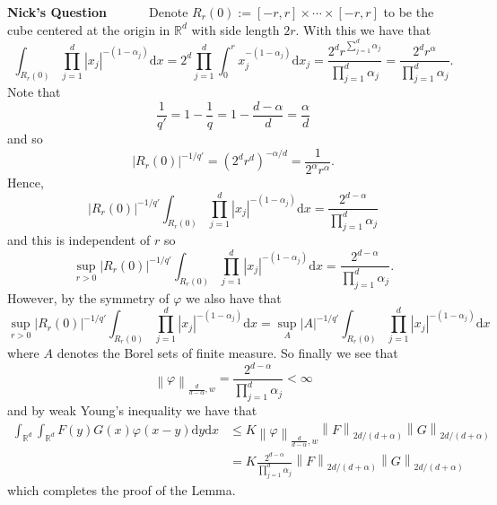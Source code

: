 \documentclass[a4paper,11pt]{article}
\numberwithin{equation}{section}
\theoremstyle{plain}
\theoremstyle{definition}
\newcommand{\ud}{\ensuremath{\mathrm{d} }}
\newcommand{\Norm}[1]{\left\|  #1   \right\|}
\newcommand{\R}{\mathbb{R}}
\newcounter{NQ}
\newenvironment{NickQuestion}[1][] %
{\refstepcounter{NQ}
	\begin{mdframed}[backgroundcolor=lightgray]\textbf{Nick's Question \theNQ \: #1~~}~~~\noindent}%
	{\end{mdframed}}
\numberwithin{NQ}{section}
\numberwithin{LQ}{section}
\numberwithin{ZQ}{section}
\begin{document}
\begin{NickQuestion}
		Denote $R_r(0) := [-r,r] \times \cdots \times [-r,r]$ to be the cube centered at the origin in $\R^d$ with side length $2r$. With this we have that
		\[
		\int_{R_r(0)} \prod_{j = 1}^d |x_j|^{-(1-\alpha_j)} \ud x = 2^d \prod_{j = 1}^d \int_{0}^r x_j^{-(1-\alpha_j)} \ud x_j = \frac{2^d r ^{\sum_{j=1}^d \alpha_j}}{\prod_{j = 1}^d \alpha_j} = \frac{2^dr^\alpha}{\prod_{j = 1}^d \alpha_j}.
		\]
		Note that
		\[
		\frac{1}{q'} = 1 - \frac{1}{q} = 1 - \frac{d-\alpha}{d} = \frac{\alpha}{d}
		\]
		and so
		\[
		|R_r(0)|^{-1/q'} = (2^dr^d)^{-\alpha/d} = \frac{1}{2^\alpha r^\alpha}.
		\]
		Hence,
		\[
		|R_r(0)|^{-1/q'} \int_{R_r(0)}  \prod_{j = 1}^d |x_j|^{-(1-\alpha_j)} \ud x = \frac{2^{d-\alpha}}{\prod_{j = 1}^d \alpha_j}
		\]
		and this is independent of $r$ so
		\[
		\sup_{r > 0} |R_r(0)|^{-1/q'} \int_{R_r(0)}  \prod_{j = 1}^d |x_j|^{-(1-\alpha_j)} \ud x = \frac{2^{d-\alpha}}{\prod_{j = 1}^d \alpha_j}.
		\]
		However, by the symmetry of $\varphi$ we also have that
		\[
		\sup_{r > 0} |R_r(0)|^{-1/q'} \int_{R_r(0)}  \prod_{j = 1}^d |x_j|^{-(1-\alpha_j)} \ud x = \sup_{A} |A|^{-1/q'} \int_{R_r(0)}  \prod_{j = 1}^d |x_j|^{-(1-\alpha_j)} \ud x
		\]
		where $A$ denotes the Borel sets of finite measure. So finally we see that
		\[
		\Norm{\varphi}_{\frac{d}{d-\alpha},w} = \frac{2^{d-\alpha}}{\prod_{j = 1}^d \alpha_j} < \infty
		\]
		and by weak Young's inequality we have that
		\begin{align*}
		\int_{\R^d}\int_{\R^d} F(y)G(x)\varphi(x-y) \ud y \ud x &\le K \Norm{\varphi}_{\frac{d}{d-\alpha},w} \Norm{F}_{2d/(d+\alpha)} \Norm{G}_{2d/(d+ \alpha)}
		\\&= K \frac{2^{d-\alpha}}{\prod_{j = 1}^d \alpha_j} \Norm{F}_{2d/(d+\alpha)} \Norm{G}_{2d/(d+ \alpha)}
		\end{align*}
		which completes the proof of the Lemma.
	\end{NickQuestion}
\end{document}
